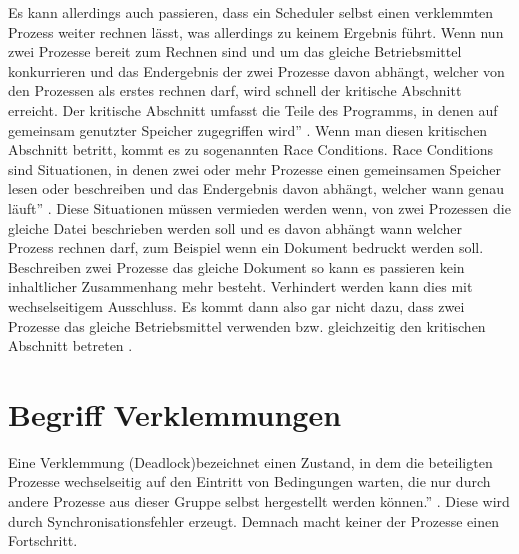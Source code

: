 Es kann allerdings auch passieren, dass ein Scheduler selbst einen verklemmten Prozess weiter rechnen lässt, was allerdings zu keinem Ergebnis führt.
Wenn nun zwei Prozesse bereit zum Rechnen sind und um das gleiche Betriebsmittel konkurrieren und das Endergebnis der zwei Prozesse davon abhängt, welcher von den Prozessen als erstes rechnen darf, wird schnell der kritische Abschnitt erreicht. Der kritische Abschnitt umfasst \glqq die Teile des Programms, in denen auf gemeinsam genutzter Speicher zugegriffen wird'' \parencite[S. 164]{tanenbaum2016}. Wenn man diesen kritischen Abschnitt betritt, kommt es zu sogenannten Race Conditions. Race Conditions sind Situationen, \glqq in denen zwei oder mehr Prozesse einen gemeinsamen Speicher lesen oder beschreiben und das Endergebnis davon abhängt, welcher wann genau läuft'' \parencite[S. 166 f.]{tanenbaum2016}. Diese Situationen müssen vermieden werden wenn, von zwei Prozessen die gleiche Datei beschrieben werden soll und es davon abhängt wann welcher Prozess rechnen darf, zum Beispiel wenn ein Dokument bedruckt werden soll. Beschreiben zwei Prozesse das gleiche Dokument so kann es passieren kein inhaltlicher Zusammenhang mehr besteht. Verhindert werden kann dies mit wechselseitigem Ausschluss. Es kommt dann also gar nicht dazu, dass zwei Prozesse das gleiche Betriebsmittel verwenden bzw. gleichzeitig den kritischen Abschnitt betreten \parencite [vgl][S.471]{sommer2002}.

\section{Begriff Verklemmungen}
\glqq Eine Verklemmung (Deadlock)bezeichnet einen Zustand, in dem die beteiligten Prozesse wechselseitig auf den Eintritt von Bedingungen warten, die nur durch andere Prozesse aus dieser Gruppe selbst hergestellt werden können.'' \parencite[S.248]{sturm2001}. Diese wird durch Synchronisationsfehler erzeugt. 
Demnach macht keiner der Prozesse einen Fortschritt.

